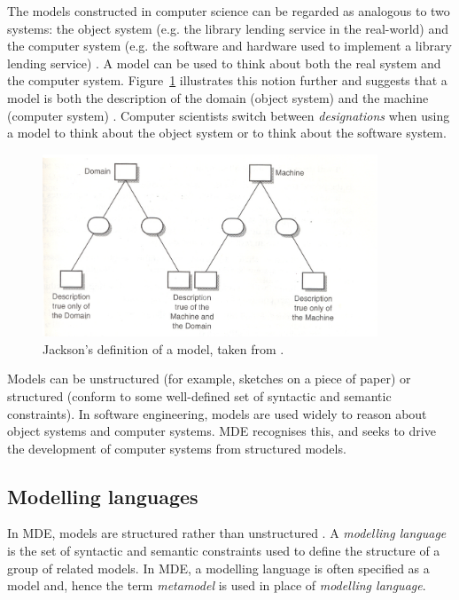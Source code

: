 The models constructed in computer science can be regarded as analogous to two systems: the object system (e.g. the library lending service in the real-world) and the computer system (e.g. the software and hardware used to implement a library lending service) \cite{jackson95software}. A model can be used to think about both the real system and the computer system. Figure~\ref{fig:jackson_model} illustrates this notion further and suggests that a model is both the description of the domain (object system) and the machine (computer system) \cite{jackson95software}. Computer scientists switch between \emph{designations} when using a model to think about the object system or to think about the software system.

\begin{figure}[htbp]
  \begin{center}
    \leavevmode
    \includegraphics[width=10cm]{2.Background/images/jackson_model.png}
  \end{center}
  \caption[Jackson's definition of a model]{Jackson's definition of a model, taken from \cite[pg.125]{jackson95software}.}
  \label{fig:jackson_model}
\end{figure}

Models can be unstructured (for example, sketches on a piece of paper) or structured (conform to some well-defined set of syntactic and semantic constraints). In software engineering, models are used widely to reason about object systems and computer systems. MDE recognises this, and seeks to drive the development of computer systems from structured models.

\subsection{Modelling languages}
\label{subsec:modelling_languages}
In MDE, models are structured rather than unstructured \cite{kolovos09thesis}. A \emph{modelling language} is the set of syntactic and semantic constraints used to define the structure of a group of related models. In MDE, a modelling language is often specified as a model and, hence the term \emph{metamodel} is used in place of \emph{modelling language}.

